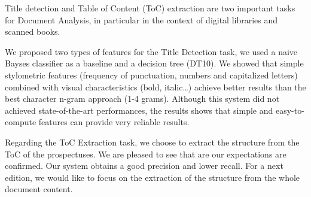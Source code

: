 
Title detection and Table of Content (ToC) extraction are two important tasks for Document Analysis, in particular in the context of digital libraries and scanned books.

We proposed two types of features for the Title Detection task, we used a naive Bayses classifier as a baseline and a decision tree (DT10). We showed that simple stylometric features (frequency of punctuation, numbers and capitalized letters) combined with visual characteristics  (bold, italic\dots) achieve better results than the best character n-gram approach (1-4 grams).
Although this system did not achieved state-of-the-art performances, the results shows that simple and easy-to-compute features can provide very reliable results.

Regarding the ToC Extraction task, we choose to extract the structure from
the ToC of the prospectuses.  We are pleased to see that are our
expectations are confirmed.  Our system obtains a good precision and
lower recall. For a next edition, we would like to focus on the extraction
of the structure from the whole document content.
